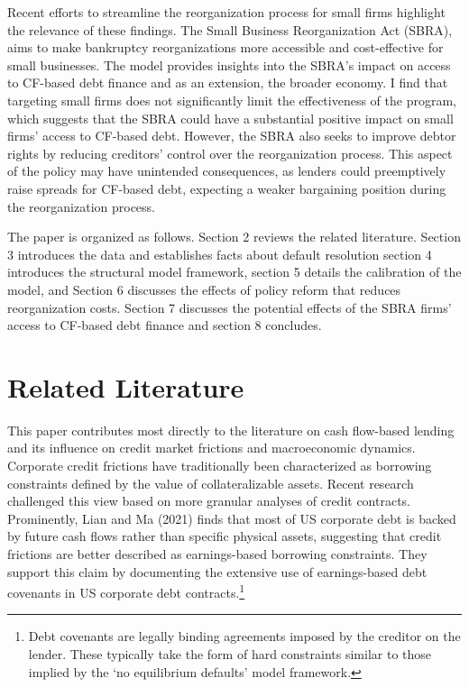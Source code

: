 \documentclass[12pt]{article}
\begin{document}
Recent efforts to streamline the reorganization process for small firms highlight the relevance of these findings. The Small Business Reorganization Act (SBRA), aims to make bankruptcy reorganizations more accessible and cost-effective for small businesses. The model provides insights into the SBRA’s impact on access to CF-based debt finance and as an extension, the broader economy. I find that targeting small firms does not significantly limit the effectiveness of the program, which suggests that the SBRA could have a substantial positive impact on small firms' access to CF-based debt. However, the SBRA also seeks to improve debtor rights by reducing creditors' control over the reorganization process. This aspect of the policy may have unintended consequences, as lenders could preemptively raise spreads for CF-based debt, expecting a weaker bargaining position during the reorganization process.

The paper is organized as follows. Section 2 reviews the related literature. Section 3 introduces the data and establishes facts about default resolution section 4 introduces the structural model framework, section 5 details the calibration of the model, and Section 6 discusses the effects of policy reform that reduces reorganization costs. Section 7 discusses the potential effects of the SBRA firms' access to CF-based debt finance and section 8 concludes.

\section{Related Literature \label{sec:literature}} 
This paper contributes most directly to the literature on cash flow-based lending and its influence on credit market frictions and macroeconomic dynamics. Corporate credit frictions have traditionally been characterized as borrowing constraints defined by the value of collateralizable assets. Recent research challenged this view based on more granular analyses of credit contracts. Prominently, Lian and Ma (2021) finds that most of US corporate debt is backed by future cash flows rather than specific physical assets, suggesting that credit frictions are better described as earnings-based borrowing constraints. They support this claim by documenting the extensive use of earnings-based debt covenants in US corporate debt contracts.\footnote{Debt covenants are legally binding agreements imposed by the creditor on the lender. These typically take the form of hard constraints similar to those implied by the `no equilibrium defaults' model framework.} 
\end{document}
